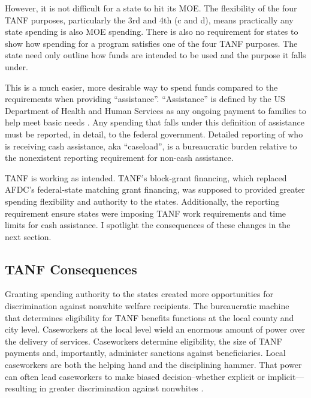 \documentclass[12pt,letterpaperpaper,]{book}
\begin{document}
However, it is not difficult for a state to hit its MOE. The flexibility
of the four TANF purposes, particularly the 3rd and 4th (c and d), means
practically any state spending is also MOE spending. There is also no
requirement for states to show how spending for a program satisfies one
of the four TANF purposes. The state need only outline how funds are
intended to be used and the purpose it falls under.

This is a much easier, more desirable way to spend funds compared to the
requirements when providing ``assistance''. ``Assistance'' is defined by
the US Department of Health and Human Services as any ongoing payment to
families to help meet basic needs \citep{falk_temporary_2016}. Any
spending that falls under this definition of assistance must be
reported, in detail, to the federal government. Detailed reporting of
who is receiving cash assistance, aka ``caseload'', is a bureaucratic
burden relative to the nonexistent reporting requirement for non-cash
assistance.

TANF is working as intended. TANF's block-grant financing, which
replaced AFDC's federal-state matching grant financing, was supposed to
provided greater spending flexibility and authority to the states.
Additionally, the reporting requirement ensure states were imposing TANF
work requirements and time limits for cash assistance. I spotlight the
consequences of these changes in the next section.

\subsection*{TANF Consequences}\label{tanf-consequences}

Granting spending authority to the states created more opportunities for
discrimination against nonwhite welfare recipients. The bureaucratic
machine that determines eligibility for TANF benefits functions at the
local county and city level. Caseworkers at the local level wield an
enormous amount of power over the delivery of services. Caseworkers
determine eligibility, the size of TANF payments and, importantly,
administer sanctions against beneficiaries. Local caseworkers are both
the helping hand and the disciplining hammer. That power can often lead
caseworkers to make biased decision--whether explicit or
implicit---resulting in greater discrimination against nonwhites
\citep{schram_deciding_2009}.
\end{document}
